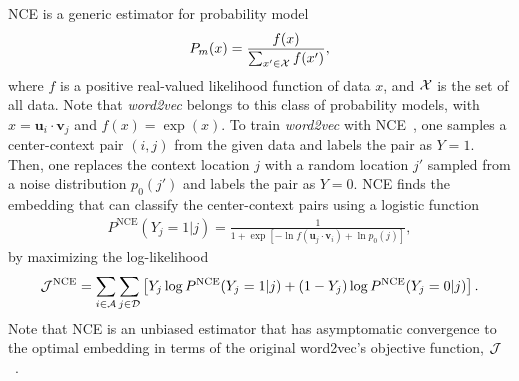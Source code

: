 \documentclass[12pt]{article} %
\newcommand{\vect}[1]{\boldsymbol{#1}}
\begin{document}
NCE is a generic estimator for probability model~\autocite{Gutmann2010}
\begin{align}
	\label{eq:nce-model}
	P_m(x) = \frac{ f(x) }{\sum_{ x' \in {\cal X}} f(x') },
\end{align}
where $f$ is a positive real-valued likelihood function of data $x$, and ${\cal X}$ is the set of all data.
Note that {\it word2vec} belongs to this class of probability models, with $x=\vect{u}_i\cdot \vect{v}_j$ and $f(x)=\exp(x)$.
To train {\it word2vec} with NCE~\autocite{mikolov2013word2vec}, one samples a center-context pair $(i,j)$ from the given data and labels the pair as $Y=1$. 
Then, one replaces the context location $j$ with a random location $j'$ sampled from a noise distribution $p_0(j')$ and labels the pair as $Y=0$. 
NCE finds the embedding that can classify the center-context pairs using a logistic function 
\begin{align}
	\label{eq:nce}
	P^{\text{NCE}}\left(Y_{j}=1 \vert j\right) = \frac{
		1
	}{
		1 + \exp\left[ - \ln f(\vect{u}_j \cdot \vect{v}_{i})  + \ln p_0(j) \right]
	},
\end{align}
by maximizing the log-likelihood
\begin{align}
	\label{eq:log-likelihood-logistic-regress}
	{\cal J}^{\text{NCE}} = \sum_{i \in {\cal A}}\sum_{j \in {\cal D}} \left[ Y_{j} \log P^{\text{NCE}}(Y_{j} = 1\vert j) + (1-Y_{j}) \log P^{\text{NCE}}(Y_{j} = 0 \vert j)\right].
\end{align}
Note that NCE is an unbiased estimator that has asymptomatic convergence to the optimal embedding in terms of the original word2vec's objective function, ${\cal J}$~\autocite{Chia2010,Dyer2014}.
\end{document}

